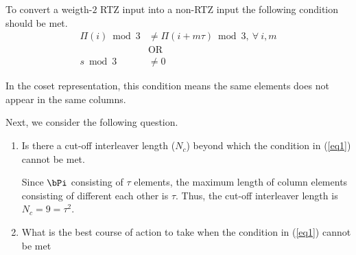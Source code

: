 \documentclass[11pt, oneside, dvipdfmx]{book}
\begin{document}
To convert a weigth-$2$ RTZ input into a non-RTZ input the following condition should be met. 
\begin{equation}
\begin{split}
 \Pi(i) \bmod 3 & \neq \Pi(i+m\tau) \bmod 3,~\forall ~i,m\\
 &\text{OR}\\
 s \bmod 3 &\neq 0
 \end{split}
 \label{eq1}
\end{equation}


In the coset representation, this condition means the same elements does not appear in the same columns.


Next, we consider the following question.

\begin{enumerate}
\item Is there a cut-off interleaver length ($N_c$) beyond which the condition in (\ref{eq1}) cannot be met.

Since $\bPi$ consisting of $\tau$ elements, the maximum length of column elements consisting of different each other is $\tau$. Thus, the cut-off interleaver length is $N_c=9=\tau^2$.

\item What is the best course of action to take when the condition
 in (\ref{eq1}) cannot be met
\end{enumerate}

\end{document}
